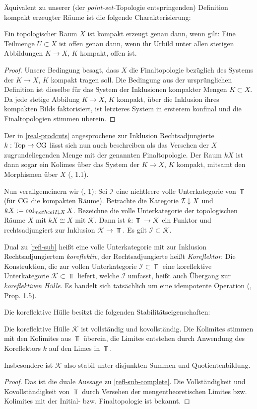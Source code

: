 Äquivalent zu unserer (der \emph{point-set-}Topologie entspringenden)
Definition kompakt erzeugter Räume ist die folgende Charakterisierung:
\begin{lemma}
  Ein topologischer Raum $X$ ist kompakt erzeugt genau dann, wenn
  gilt: Eine Teilmenge $U \subset X$ ist offen genau dann, wenn ihr
  Urbild unter allen stetigen Abbildungen $K \to X$, $K$ kompakt,
  offen ist.
\end{lemma}
\begin{proof}
  Unsere Bedingung besagt, dass $X$ die Finaltopologie bezüglich des
  Systems der $K \to X$, $K$ kompakt tragen soll. Die Bedingung aus
  der ursprünglichen Definition ist dieselbe für das System der
  Inklusionen kompakter Mengen $K \subset X$. Da jede stetige Abbilung
  $K \to X$, $K$ kompakt, über die Inklusion ihres kompakten Bilds
  faktorisiert, ist letzteres System in ersterem konfinal und die
  Finaltopologien stimmen überein.
\end{proof}
Der in \ref{real-prodcuts} angesprochene zur Inklusion
Rechtsadjungierte $k: \operatorname{Top} \to \operatorname{CG}$ lässt sich nun auch beschreiben
als das Versehen der $X$ zugrundeliegenden Menge mit der genannten
Finaltopologie. Der Raum $kX$ ist dann sogar ein Kolimes über das
System der $K \to X$, $K$ kompakt, mitsamt den Morphismen über $X$
(\cite{Vogt}, 1.1).

Nun verallgemeinern wir (\cite{Vogt}, 1): Sei $\mathcal{I}$ eine
nichtleere volle Unterkategorie von $\Top$ (für $\operatorname{CG}$ die kompakten
Räume). Betrachte die Kategorie $\mathcal{I} \downarrow \! {\scriptstyle } \, X$ und $kX
:= \operatorname{col}_{mathcal{I} \downarrow \! {\scriptstyle } \, X} X$. Bezeichne die volle
Unterkategorie der topologischen Räume $X$ mit $kX \cong X$ mit
$\mathcal{K}$. Dann ist $k: \Top \to \mathcal{K}$ ein Funktor und
rechtsadjungiert zur Inklusion $\mathcal{K} \to \Top$. Es gilt
$\mathcal{I} \subset \mathcal{K}$.
\begin{bem}
  Dual zu \ref{refl-sub} heißt eine volle Unterkategorie mit zur
  Inklusion Rechtsadjungiertem \emph{koreflektiv}, der
  Rechtsadjungierte heißt \emph{Koreflektor}. Die Konstruktion, die
  zur vollen Unterkategorie $\mathcal{I} \subset \Top$ eine
  koreflektive Unterkategorie $\mathcal{K} \subset \Top$ liefert,
  welche $\mathcal{I}$ umfasst, heißt auch Übergang zur
  \emph{koreflektiven Hülle}. Es handelt sich tatsächlich um eine
  idempotente Operation (\cite{Vogt}, Prop. 1.5).
\end{bem}
Die koreflektive Hülle besitzt die folgenden Stabilitätseigenschaften:
\begin{prop} \label{k-complete}
  Die koreflektive Hülle $\mathcal{K}$ ist vollständig und
  kovollständig. Die Kolimites stimmen mit den Kolimites aus $\Top$
  überein, die Limites entstehen durch Anwendung des Koreflektors $k$
  auf den Limes in $\Top$.
\end{prop}
Insbesondere ist $\mathcal{K}$ also stabil unter disjunkten Summen und
Quotientenbildung.
\begin{proof}
  Das ist die duale Aussage zu \ref{refl-sub-complete}. Die
  Vollständigkeit und Kovollständigkeit von $\Top$ durch Versehen der
  mengentheoretischen Limites bzw. Kolimites mit der Initial-
  bzw. Finaltopologie ist bekannt.
\end{proof}

